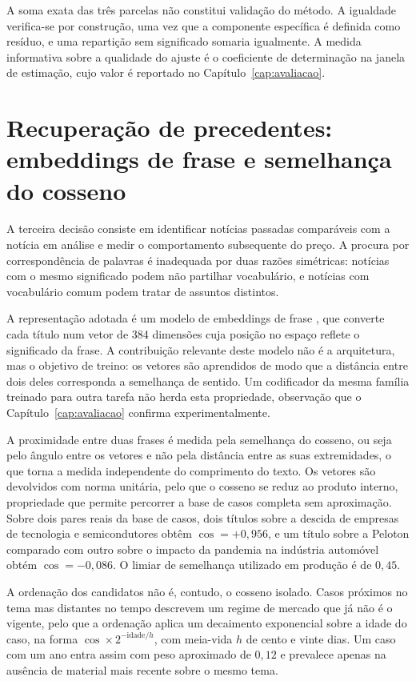 A soma exata das três parcelas não constitui validação do método. A igualdade verifica-se por
construção, uma vez que a componente específica é definida como resíduo, e uma repartição sem
significado somaria igualmente. A medida informativa sobre a qualidade do ajuste é o coeficiente
de determinação na janela de estimação, cujo valor é reportado no Capítulo~\ref{cap:avaliacao}.

\section{Recuperação de precedentes: embeddings de frase e semelhança do cosseno}
\label{sec:met_recuperacao}

A terceira decisão consiste em identificar notícias passadas comparáveis com a notícia em análise
e medir o comportamento subsequente do preço. A procura por correspondência de palavras é
inadequada por duas razões simétricas: notícias com o mesmo significado podem não partilhar
vocabulário, e notícias com vocabulário comum podem tratar de assuntos distintos.

A representação adotada é um modelo de embeddings de frase \autocite{reimers2019sbert}, que
converte cada título num vetor de 384 dimensões cuja posição no espaço reflete o significado da
frase. A contribuição relevante deste modelo não é a arquitetura, mas o objetivo de treino: os
vetores são aprendidos de modo que a distância entre dois deles corresponda a semelhança de
sentido. Um codificador da mesma família treinado para outra tarefa não herda esta propriedade,
observação que o Capítulo~\ref{cap:avaliacao} confirma experimentalmente.

A proximidade entre duas frases é medida pela semelhança do cosseno, ou seja pelo ângulo entre os
vetores e não pela distância entre as suas extremidades, o que torna a medida independente do
comprimento do texto. Os vetores são devolvidos com norma unitária, pelo que o cosseno se reduz ao
produto interno, propriedade que permite percorrer a base de casos completa sem aproximação. Sobre
dois pares reais da base de casos, dois títulos sobre a descida de empresas de tecnologia e
semicondutores obtêm $\cos = +0{,}956$, e um título sobre a Peloton comparado com outro sobre o
impacto da pandemia na indústria automóvel obtém $\cos = -0{,}086$. O limiar de semelhança
utilizado em produção é de $0{,}45$.

A ordenação dos candidatos não é, contudo, o cosseno isolado. Casos próximos no tema mas distantes
no tempo descrevem um regime de mercado que já não é o vigente, pelo que a ordenação aplica um
decaimento exponencial sobre a idade do caso, na forma $\cos \times 2^{-\text{idade}/h}$, com
meia-vida $h$ de cento e vinte dias. Um caso com um ano entra assim com peso aproximado de $0{,}12$
e prevalece apenas na ausência de material mais recente sobre o mesmo tema.

